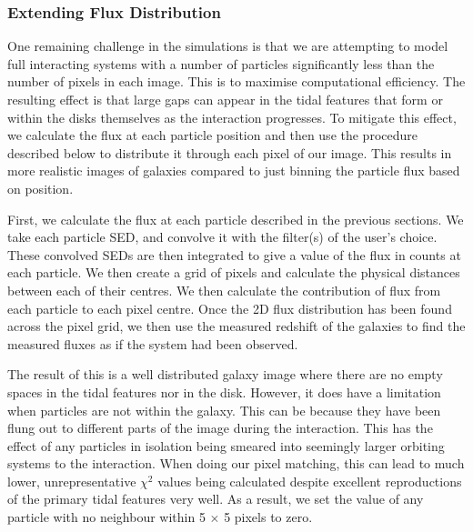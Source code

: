 \subsubsection{Extending Flux Distribution}\label{flux_dist}
\noindent One remaining challenge in the simulations is that we are attempting to model full interacting systems with a number of particles significantly less than the number of pixels in each image. This is to maximise computational efficiency. The resulting effect is that large gaps can appear in the tidal features that form or within the disks themselves as the interaction progresses. To mitigate this effect, we calculate the flux at each particle position and then use the procedure described below to distribute it through each pixel of our image. This results in more realistic images of galaxies compared to just binning the particle flux based on position.

First, we calculate the flux at each particle described in the previous sections. We take each particle SED, and convolve it with the filter(s) of the user's choice. These convolved SEDs are then integrated to give a value of the flux in counts at each particle. We then create a grid of pixels and calculate the physical distances between each of their centres. We then calculate the contribution of flux from each particle to each pixel centre. Once the 2D flux distribution has been found across the pixel grid, we then use the measured redshift of the galaxies to find the measured fluxes as if the system had been observed.

The result of this is a well distributed galaxy image where there are no empty spaces in the tidal features nor in the disk. However, it does have a limitation when particles are not within the galaxy. This can be because they have been flung out to different parts of the image during the interaction. This has the effect of any particles in isolation being smeared into seemingly larger orbiting systems to the interaction. When doing our pixel matching, this can lead to much lower, unrepresentative $\chi^{2}$ values being calculated despite excellent reproductions of the primary tidal features very well. As a result, we set the value of any particle with no neighbour within 5 $\times$ 5 pixels to zero. 


